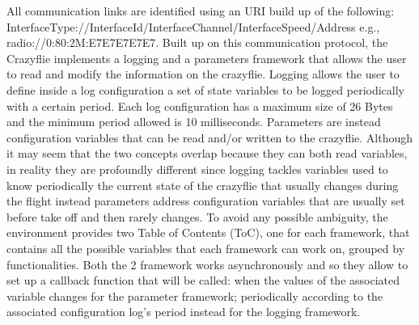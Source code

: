 All communication links are identified using an URI build up of the following: InterfaceType://InterfaceId/InterfaceChannel/InterfaceSpeed/Address e.g., radio://0:80:2M:E7E7E7E7E7.
Built up on this communication protocol, the Crazyflie implements a logging and a parameters framework that allows the user to read and modify the information on the crazyflie. 
Logging allows the user to define inside a log configuration a set of state variables to be logged periodically with a certain period. Each log configuration has a maximum size of 26 Bytes and the minimum period allowed is 10 milliseconds. 
Parameters are instead configuration variables that can be read and/or written to the crazyflie. 
Although it may seem that the two concepts overlap because they can both read variables, in reality they are profoundly different since logging tackles variables used to know periodically the current state of the crazyflie that usually changes during the flight instead parameters address configuration variables that are usually set before take off and then rarely changes. To avoid any possible ambiguity, the environment provides two Table of Contents (ToC), one for each framework, that contains all the possible variables that each framework can work on, grouped by functionalities.
Both the 2 framework works asynchronously and so they allow to set up a callback function that will be called: when the values of the associated variable changes for the parameter framework; periodically according to the associated configuration log's period instead for the logging framework.
